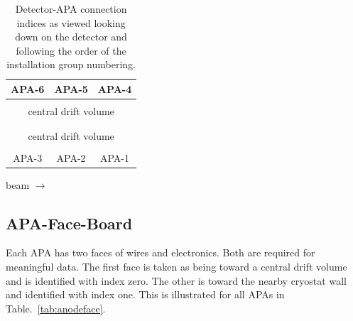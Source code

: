 \documentclass[pdftex,12pt,letter]{article}
\begin{document}
\begin{table}[htp]
  
  \centering
  \begin{tabular}[h]{|c|c|c|}
    \hline
    \hline
    \hline
    APA-6 & APA-5 & APA-4\\
    \hline
    \multicolumn{3}{|c|}{}\\
    \multicolumn{3}{|c|}{central drift volume}\\
    \multicolumn{3}{|c|}{}\\
    \hline
    \hline
    \hline
    \multicolumn{3}{|c|}{}\\
    \multicolumn{3}{|c|}{central drift volume}\\
    \multicolumn{3}{|c|}{}\\
    \hline
    APA-3 & APA-2 & APA-1\\
    \hline
    \hline
    \hline
  \end{tabular}

  beam $\longrightarrow$

  \caption{Detector-APA connection indices as viewed looking down on
    the detector and following the order of the installation group
    numbering.}
  \label{tab:tpc}

\end{table}


\subsection{APA-Face-Board}

Each APA has two faces of wires and electronics.  Both are required
for meaningful data.  The first face is taken as being toward a
central drift volume and is identified with index zero.  The other is
toward the nearby cryostat wall and identified with index one.  This
is illustrated for all APAs in Table.~\ref{tab:anodeface}.
\end{document}
